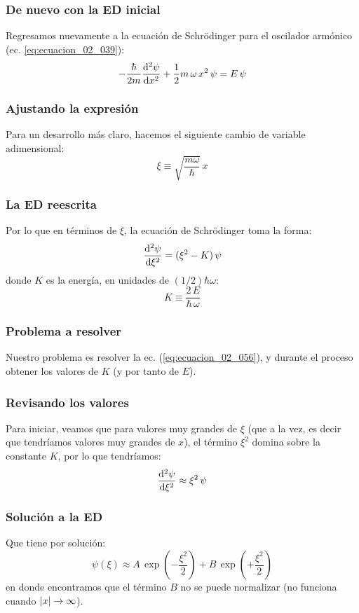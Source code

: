 \documentclass[12pt]{beamer}
\begin{document}
\begin{frame}
\frametitle{De nuevo con la ED inicial}
Regresamos nuevamente a la ecuación de Schrödinger para el oscilador armónico (ec. \ref{eq:ecuacion_02_039}):
\pause
\begin{align*}
- \dfrac{\hbar}{2 m} \dv[2]{\psi}{x} + \dfrac{1}{2} m \, \omega \, x^{2} \, \psi = E \, \psi  
\end{align*}
\end{frame}
\begin{frame}
\frametitle{Ajustando la expresión}
Para un desarrollo más claro, hacemos el siguiente cambio de variable adimensional:
\pause
\begin{equation}
\xi \equiv \sqrt{ \dfrac{m \omega}{\hbar}} \, x
\label{eq:ecuacion_02_055}
\end{equation}
\end{frame}
\begin{frame}
\frametitle{La ED reescrita}
Por lo que en términos de $\xi$, la ecuación de Schrödinger toma la forma:
\pause
\begin{equation}
\dv[2]{\psi}{\xi} = (\xi^{2} - K) \, \psi
\label{eq:ecuacion_02_056}
\end{equation}
donde $K$ es la energía, en unidades de $(1/2) \hbar \omega$:
\pause
\begin{equation}
K \equiv \dfrac{2 \, E}{\hbar \, \omega}
\label{eq:ecuacion_02_057}
\end{equation}
\end{frame}
\begin{frame}
\frametitle{Problema a resolver}
Nuestro problema es resolver la ec. (\ref{eq:ecuacion_02_056}), y durante el proceso obtener los valores  de $K$ (y por tanto de $E$).
\end{frame}
\begin{frame}
\frametitle{Revisando los valores}
Para iniciar, veamos que para valores muy grandes de $\xi$ (que a la vez, es decir que tendríamos valores muy grandes de $x$), \pause el término $\xi^{2}$ domina sobre la constante $K$, por lo que tendríamos:
\pause
\begin{equation}
\dv[2]{\psi}{\xi} \approx \xi^{2} \, \psi
\label{eq:ecuacion_02_058}
\end{equation}
\end{frame}
\begin{frame}
\frametitle{Solución a la ED}
Que tiene por solución:
\pause
\begin{equation}
\psi (\xi) \approx A \, \exp \left( - \dfrac{\xi^{2}}{2} \right) + B \, \exp \left( + \dfrac{\xi^{2}}{2} \right)
\label{eq:ecuacion_02_059}
\end{equation}
\pause
en donde encontramos que el término $B$ no se puede normalizar (no funciona cuando $\abs{x} \to \infty$).
\end{frame}
\end{document}
